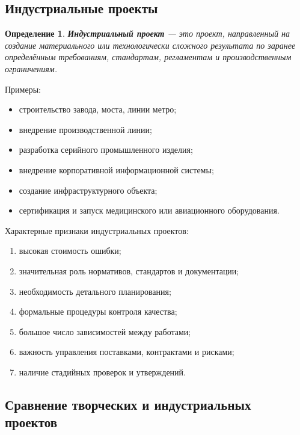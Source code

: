\documentclass[12pt,a4paper]{article}
\newtheorem{definition}{Определение}
\begin{document}
\subsection{Индустриальные проекты}

\begin{definition}
\textbf{Индустриальный проект} --- это проект, направленный на создание материального или технологически сложного результата по заранее определённым требованиям, стандартам, регламентам и производственным ограничениям.
\end{definition}

Примеры:
\begin{itemize}
    \item строительство завода, моста, линии метро;
    \item внедрение производственной линии;
    \item разработка серийного промышленного изделия;
    \item внедрение корпоративной информационной системы;
    \item создание инфраструктурного объекта;
    \item сертификация и запуск медицинского или авиационного оборудования.
\end{itemize}

Характерные признаки индустриальных проектов:
\begin{enumerate}
    \item высокая стоимость ошибки;
    \item значительная роль нормативов, стандартов и документации;
    \item необходимость детального планирования;
    \item формальные процедуры контроля качества;
    \item большое число зависимостей между работами;
    \item важность управления поставками, контрактами и рисками;
    \item наличие стадийных проверок и утверждений.
\end{enumerate}

\subsection{Сравнение творческих и индустриальных проектов}
\end{document}
